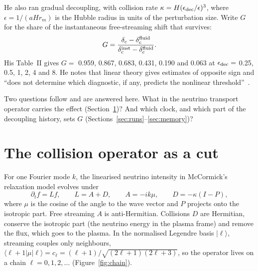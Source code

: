 \documentclass[11pt]{article}
\begin{document}
He also ran gradual decoupling, with collision rate $\kappa=H(\epsilon_{\rm dec}/\epsilon)^3$, where $\epsilon=1/(aHr_m)$ is the Hubble radius in units of the perturbation size. Write $G$ for the share of the instantaneous free-streaming shift that survives:
\begin{equation}
G=\frac{\delta_c-\delta_c^{\rm fluid}}{\delta_c^{\rm inst}-\delta_c^{\rm fluid}}.
\end{equation}
His Table~II gives $G=$ 0.959, 0.867, 0.683, 0.431, 0.190 and 0.063 at $\epsilon_{\rm dec}=$ 0.25, 0.5, 1, 2, 4 and 8. He notes that linear theory gives estimates of opposite sign and ``does not determine which diagnostic, if any, predicts the nonlinear threshold''~\cite[Sec.~IV\,C]{McC}.

Two questions follow and are answered here. What in the neutrino transport operator carries the effect (Section~\ref{sec:cut})? And which clock, and which part of the decoupling history, sets $G$ (Sections~\ref{sec:runs}--\ref{sec:memory})?

\section{The collision operator as a cut}\label{sec:cut}

For one Fourier mode $k$, the linearised neutrino intensity in McCormick's relaxation model evolves under
\begin{equation}
\partial_t f=L f,\qquad L=A+D,\qquad A=-ik\mu,\qquad D=-\kappa(I-P),
\end{equation}
where $\mu$ is the cosine of the angle to the wave vector and $P$ projects onto the isotropic part. Free streaming $A$ is anti-Hermitian. Collisions $D$ are Hermitian, conserve the isotropic part (the neutrino energy in the plasma frame) and remove the flux, which goes to the plasma. In the normalised Legendre basis $|\ell\rangle$, streaming couples only neighbours, $\langle\ell+1|\mu|\ell\rangle=c_\ell=(\ell+1)/\sqrt{(2\ell+1)(2\ell+3)}$, so the operator lives on a chain $\ell=0,1,2,\dots$ (Figure~\ref{fig:chain}).
\end{document}
